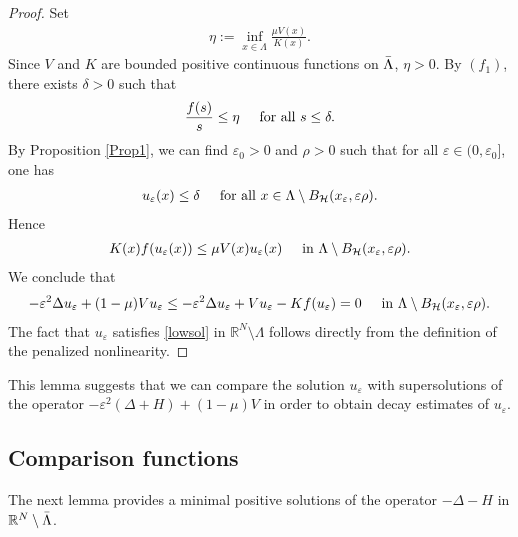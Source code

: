 \documentclass[a4paper]{amsart}
\begin{document}
\begin{proof}
 Set
\begin{align*}
 \eta := \inf_{x\in \Lambda} \frac{\mu V(x)}{K(x)}.
\end{align*}
Since $V$ and $K$ are bounded positive continuous functions on $\Bar{\Lambda}$, $\eta > 0$. By $(f_1)$, there exists
$\delta > 0$ such that 
\begin{align*}
 \frac{f(s)}{s} \leq \eta \hspace{0.5cm} \text{for all} \ s \leq \delta.
\end{align*}
By Proposition \ref{Prop1}, we can find $\varepsilon_0 > 0$ and $\rho >0$ such that for all $\varepsilon \in (0,\varepsilon_0]$,
one
has
\begin{align*}
 u_{\varepsilon}(x) \leq \delta \hspace{0.5cm} \text{for all} \ x \in \Lambda \setminus
B_\mathcal{H}(x_{\varepsilon},\varepsilon \rho).
\end{align*}
Hence
\begin{align*}
 K(x) f(u_{\varepsilon}(x)) \leq \mu V(x) u_{\varepsilon}(x) \hspace{0.5cm} \text{in} \ \Lambda \setminus
B_\mathcal{H}(x_{\varepsilon},\varepsilon \rho).
\end{align*}
We conclude that
\begin{align*}
 -\varepsilon^2 \Delta u_{\varepsilon} + (1 - \mu)V u_{\varepsilon} \leq -\varepsilon^2 \Delta u_{\varepsilon} + V u_{\varepsilon} - K
f(u_{\varepsilon}) = 0 \hspace{0.5cm} \text{in} \ \Lambda \setminus B_\mathcal{H}(x_{\varepsilon},\varepsilon \rho).
\end{align*}
The fact that $u_{\varepsilon}$ satisfies \eqref{lowsol} in ${\mathbb{R}}^N \setminus\Lambda$ follows directly from the definition of
the
penalized nonlinearity.
\end{proof}

This lemma suggests that we can compare the solution $u_{\varepsilon}$ with supersolutions of the operator $-\varepsilon^2
\left( \Delta + H \right) + (1 - \mu)V$ in order to obtain decay estimates of $u_{\varepsilon}$. 

\subsection{Comparison functions}

The next lemma provides a minimal positive solutions of the operator $- \Delta - H$ in ${\mathbb{R}}^N\setminus
\Bar{\Lambda}$.
\end{document}
